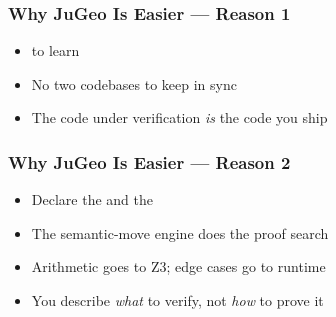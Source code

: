 \begin{frame}
\frametitle{Why JuGeo Is Easier --- Reason 1}
\vfill
\begin{center}
\end{center}
\vfill
\begin{itemize}
  \item {} to learn
  \item No two codebases to keep in sync
  \item The code under verification \emph{is} the code you ship
\end{itemize}
\vfill
\end{frame}

\begin{frame}
\frametitle{Why JuGeo Is Easier --- Reason 2}
\vfill
\begin{center}
\end{center}
\vfill
\begin{itemize}
  \item Declare the  and the 
  \item The semantic-move engine does the proof search
  \item Arithmetic goes to Z3; edge cases go to runtime
  \item You describe \emph{what} to verify, not \emph{how} to prove it
\end{itemize}
\vfill
\end{frame}

